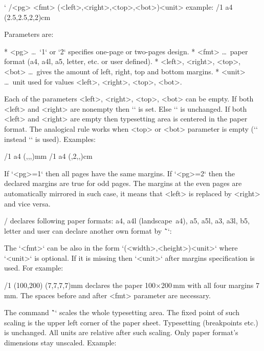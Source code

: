 \begtt \catcode`
\margins/<pg> <fmt> (<left>,<right>,<top>,<bot>)<unit>
  example:
\margins/1 a4 (2.5,2.5,2,2)cm
\endtt

Parameters are:

\begitems
* <pg> \dots\ `1` or `2` specifies one-page or two-pages design.
* <fmt> \dots\ paper format (a4, a4l, a5, letter, etc. or user defined).
* <left>, <right>, <top>, <bot> \dots\ gives the amount of left, right,
      top and bottom margins.
* <unit> \dots\ unit used for values <left>, <right>, <top>, <bot>.
\enditems

Each of the parameters <left>, <right>, <top>, <bot> can be empty.
If both <left> and <right> are nonempty then `\hsize` is set. Else `\hsize`
is unchanged. If both <left> and <right> are empty then typesetting area is
centered in the paper format. The analogical rule works when <top> or <bot>
parameter is empty (`\vsize` instead `\hsize` is used). Examples:

\begtt
\margins/1 a4 (,,,)mm   %
\margins/1 a4 (,2,,)cm  %
\endtt

If `<pg>=1` then all pages have the same margins. If `<pg>=2` then the
declared margins are true for odd pages. The margins at the even pages are
automatically mirrored in such case, it means that <left> is replaced by
<right> and vice versa.

\OpTeX/ declares following paper formats: a4, a4l (landscape~a4),
a5, a5l, a3, a3l, b5, letter and user can declare another own format by \~`\sdef`:

\begtt
{}
\endtt

The `<fmt>` can be also in the form `(<width>,<height>)<unit>` where `<unit>` is
optional. If it is missing then `<unit>` after margins specification is
used. For example:

\begtt
\margins/1 (100,200) (7,7,7,7)mm
\endtt
%
declares the paper 100$\times$200\,mm with all four margins 7\,mm. The spaces
before and after <fmt> parameter are necessary.

The command \^`\magscale[<factor>]` scales the whole typesetting area.
\new The fixed point of such scaling is the upper left corner of the paper sheet.
Typesetting (breakpoints etc.) is unchanged. All units are relative after
such scaling. Only paper format's dimensions stay unscaled. Example:

